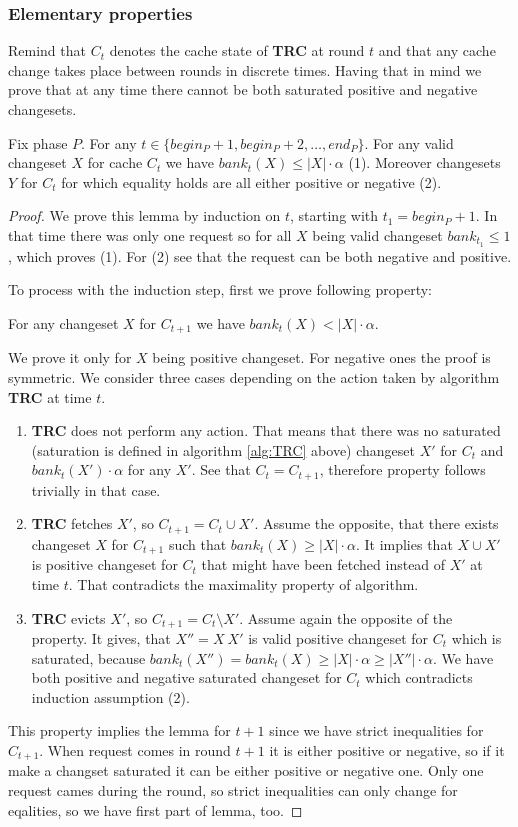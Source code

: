 \subsubsection{Elementary properties}
Remind that $C_t$ denotes the cache state of \textbf{TRC} at round $t$ and that 
any cache change takes place between rounds in discrete times. 
Having that in mind we prove that at any time there cannot be both saturated 
positive and negative changesets.
\begin{lemma}
 Fix phase $P$. For any $t \in \{begin_P +1, begin_P + 2, \ldots, end_P\}$. 
For any valid changeset $X$ for cache $C_t$ we have $bank_t(X) \leq |X| \cdot 
\alpha$ (1). Moreover changesets $Y$ for $C_t$ for which equality holds are 
all either positive or negative (2).
\end{lemma}
\begin{proof}
We prove this lemma by induction on $t$, starting with $t_1 = begin_P +1$. In 
that time there was only one request so for all $X$ being valid changeset 
$bank_{t_1} \leq 1$, which proves (1). For (2) see that the request can be both 
negative and positive.

To process with the induction step, first we prove following property:
\begin{property}
For any changeset $X$ for $C_{t+1}$ we have $bank_t(X) < |X| \cdot \alpha$.
\end{property}
We prove it only for $X$ being positive changeset. For negative ones the proof 
is symmetric. We consider three cases depending on the action taken by 
algorithm \textbf{TRC} at time $t$.
\begin{enumerate}
 \item \textbf{TRC} does not perform any action. That means that there was no 
saturated (saturation is defined in algorithm \ref{alg:TRC} above) changeset 
$X'$ for $C_t$ and $bank_t(X') \cdot \alpha$ for any $X'$. See that $C_t = 
C_{t+1}$, therefore property follows trivially in that case.
  \item \textbf{TRC} fetches $X'$, so $C_{t+1} = C_t \cup X'$. Assume the 
opposite, that there exists changeset $X$ for $C_{t+1}$ such that $bank_t(X) 
\geq |X| \cdot \alpha$. It implies that $X \cup X'$ is positive changeset for 
$C_t$ that might have been fetched instead of $X'$ at time $t$. That 
contradicts the maximality property of algorithm.
  \item \textbf{TRC} evicts $X'$, so $C_{t+1}  = C_t \setminus X'$. Assume 
again the opposite of the property. It gives, that $X'' = X \ X'$ is valid 
positive changeset for $C_t$ which is saturated, because $bank_t(X'') = 
bank_t(X) \geq |X| \cdot \alpha \geq |X''| \cdot \alpha$. We have both positive 
and negative saturated changeset for $C_t$ which contradicts induction 
assumption (2).
\end{enumerate}
This property implies the lemma for $t+1$ since we have strict inequalities for 
$C_{t+1}$. When request comes in round $t+1$ it is either positive or negative, 
so if it make a changset saturated it can be either positive or negative one. 
Only one request cames during the round, so strict inequalities can only change 
for eqalities, so we have first part of lemma, too.
\end{proof}
